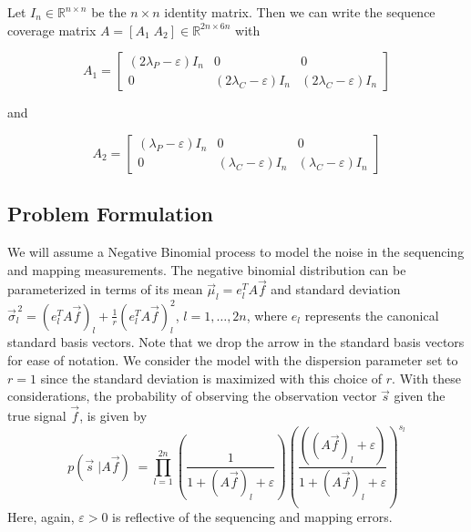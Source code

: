 \documentclass{article}
\def\R{\mathbb{R}} %
\begin{document}
	Let $I_n \in \R^{n \times n}$ be the $n \times n$ identity matrix. Then we can write the sequence coverage matrix $A = [A_1 \; A_2] \in \R^{2n \times 6n}$ with
	\renewcommand{\arraystretch}{2}
	\begin{center}
		$$ A_1 = 
		\left[
		\begin{array}{c|c|c}
			(2 \lambda_P - \varepsilon)I_n  & 0 & 0 \\ \hline
			0  & (2 \lambda_C - \varepsilon)I_n &  (2 \lambda_C - \varepsilon)I_n 
		\end{array}
		\right]
		$$
	\end{center}
	and 
	\begin{center}
		$$ A_2 = 
		\left[
		\begin{array}{c|c|c}
			(\lambda_P - \varepsilon)I_n  & 0 & 0 \\ \hline
			0  & (\lambda_C - \varepsilon)I_n &  (\lambda_C- \varepsilon)I_n 
		\end{array}
		\right]
		$$
	\end{center}

\subsection{Problem Formulation}
We will assume a Negative Binomial process to model the noise in the sequencing and mapping measurements. The negative binomial distribution can be parameterized in terms of its mean $\vec{\mu}_l = e_{l}^{T} A \vec{f}$ and standard deviation $\vec{\sigma}_{l}^{\,2} = (e_{l}^{T} A \vec{f})_{l} + \frac{1}{r} (e_{l}^{T} A \vec{f})_{l}^{2} $, $l=1, \dots, 2n$, where $e_l$ represents the canonical standard basis vectors. Note that we drop the arrow in the standard basis vectors for ease of notation. We consider the model with the dispersion parameter set to $r =1$ since the standard deviation is maximized with this choice of $r$. With these considerations, the probability of observing the observation vector $\vec{s}$ given the true signal $\vec{f}$, is given by 
\begin{equation} \label{negBinModel_probability}
	p(\vec{s} \; | A\vec{f})\; = \prod_{l=1}^{2n} \left( \frac{1}{1+ (A \vec{f})_l + \varepsilon} \right) \left(  \frac{((A \vec{f})_l + \varepsilon)}{1+ (A \vec{f})_l + \varepsilon} \right)^{s_l} 
\end{equation}
Here, again,  $\varepsilon>0$ is reflective of the sequencing and mapping errors. \\
\end{document}
